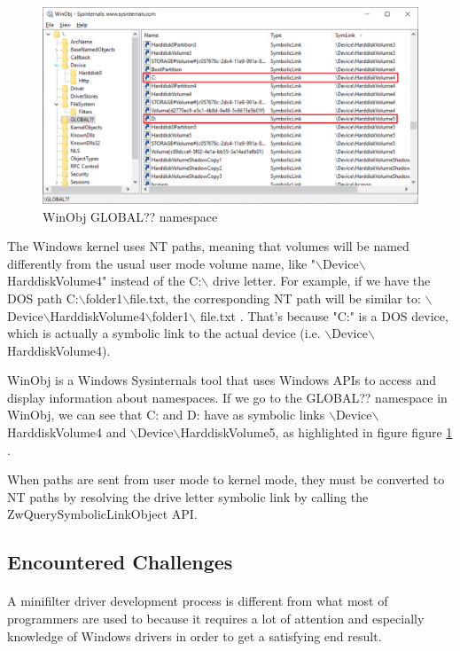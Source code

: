 		\begin{figure}[h!]
			\begin{center}
				\includegraphics[scale=0.6]{images/WinObj.jpg}
				\caption{WinObj GLOBAL?? namespace}
				\label{fig:WinObj}
			\end{center}
		\end{figure}
		
		The Windows kernel uses NT paths, meaning that volumes will be named differently from the usual user mode volume name, like "$\backslash$Device$\backslash$HarddiskVolume4" instead of the C:$\backslash$ drive letter. For example, if we have the DOS path C:$\backslash$folder1$\backslash$file.txt, the corresponding NT path will be similar to: $\backslash$Device$\backslash$HarddiskVolume4$\backslash$folder1$\backslash$ file.txt  \cite{MSDNNamespaces}. That's because "C:" is a DOS device, which is actually a symbolic link to the actual device (i.e. $\backslash$Device$\backslash$HarddiskVolume4).
		
		WinObj is a Windows Sysinternals tool that uses Windows APIs to access and display information about namespaces. If we go to the GLOBAL?? namespace in WinObj, we can see that C: and D: have as symbolic links $\backslash$Device$\backslash$ HarddiskVolume4 and $\backslash$Device$\backslash$HarddiskVolume5, as highlighted in figure figure \ref{fig:WinObj} .
		
		When paths are sent from user mode to kernel mode, they must be converted to NT paths by resolving the drive letter symbolic link by calling the ZwQuerySymbolicLinkObject API.
		
		\subsection{Encountered Challenges}
		\paragraph{}
		 A minifilter driver development process is different from what most of programmers are used to because it requires a lot of attention and especially knowledge of Windows drivers in order to get a satisfying end result.
		
